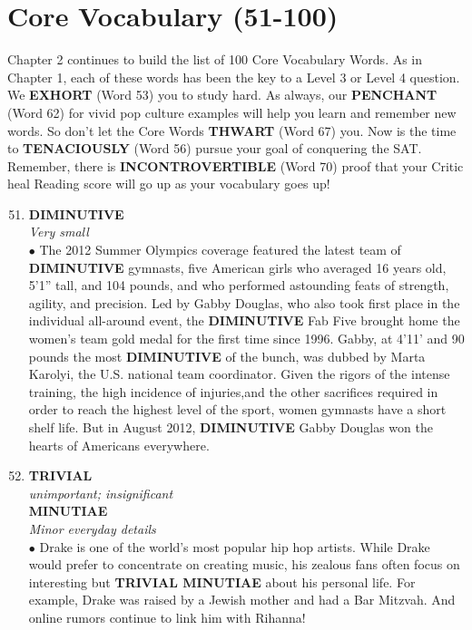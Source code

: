 \documentclass{book}
\begin{document}
\chapter{Core Vocabulary (51-100)}
Chapter 2 continues to build the list of 100 Core Vocabulary Words. As in Chapter 1, each of these words has been the key to a Level 3 or Level 4 question. We \textbf{EXHORT} (Word 53) you to study hard. As always, our \textbf{PENCHANT} (Word 62) for vivid pop culture examples will help you learn and remember new words. So don't let the Core Words \textbf{THWART} (Word 67) you. Now is the time to \textbf{TENACIOUSLY} (Word 56) pursue your goal of conquering the SAT. Remember, there is \textbf{INCONTROVERTIBLE} (Word 70) proof that your Critic heal Reading score will go up as your vocabulary goes up!
\begin{enumerate}
 \setcounter{enumi}{50}
\item \textbf{DIMINUTIVE}\\
\textit{Very small}\\

$\bullet$ The 2012 Summer Olympics coverage featured the latest team of \textbf{DIMINUTIVE} gymnasts, five American girls who averaged 16 years old, 5'1'' tall, and 104 pounds, and who performed astounding feats of strength, agility, and precision. Led by Gabby Douglas, who also took first place in the individual all-around event, the \textbf{DIMINUTIVE} Fab Five brought home the women’s team gold medal for the first time since 1996. Gabby, at 4’11’ and 90 pounds the most \textbf{DIMINUTIVE} of the bunch, was dubbed   by Marta Karolyi, the U.S. national team coordinator. Given the rigors of the intense training, the high incidence of injuries,and the other sacrifices required in order to reach the highest level of the sport, women gymnasts have a short shelf life. But in August 2012, \textbf{DIMINUTIVE} Gabby Douglas won the hearts of Americans everywhere.
\item \textbf{TRIVIAL}\\
 \textit{ unimportant; insignificant}\\
 \textbf{MINUTIAE}\\
 \textit{Minor everyday details}\\
 
 $\bullet$ Drake is one of the world's most popular hip hop artists. While Drake would prefer to concentrate on creating music, his zealous fans often focus on interesting but \textbf{TRIVIAL MINUTIAE} about his personal life. For example, Drake was raised by a Jewish mother and had a Bar Mitzvah. And online rumors continue to link him with Rihanna!


\end{enumerate}
\end{document}
